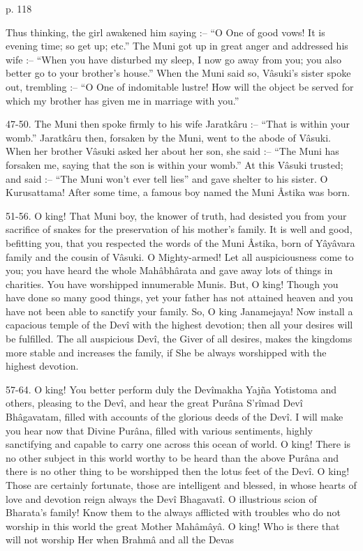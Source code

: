  

p. 118

 

Thus thinking, the girl awakened him saying :-- “O One of good vows! It is evening time; so get up; etc.” The Muni got up in great anger and addressed his wife :-- “When you have disturbed my sleep, I now go away from you; you also better go to your brother's house.” When the Muni said so, Vâsuki's sister spoke out, trembling :-- “O One of indomitable lustre! How will the object be served for which my brother has given me in marriage with you.”

 

47-50. The Muni then spoke firmly to his wife Jaratkâru :-- “That is within your womb.” Jaratkâru then, forsaken by the Muni, went to the abode of Vâsuki. When her brother Vâsuki asked her about her son, she said :-- “The Muni has forsaken me, saying that the son is within your womb.” At this Vâsuki trusted; and said :-- “The Muni won't ever tell lies” and gave shelter to his sister. O Kurusattama! After some time, a famous boy named the Muni Âstika was born.

 

51-56. O king! That Muni boy, the knower of truth, had desisted you from your sacrifice of snakes for the preservation of his mother's family. It is well and good, befitting you, that you respected the words of the Muni Âstika, born of Yâyâvara family and the cousin of Vâsuki. O Mighty-armed! Let all auspiciousness come to you; you have heard the whole Mahâbhârata and gave away lots of things in charities. You have worshipped innumerable Munis. But, O king! Though you have done so many good things, yet your father has not attained heaven and you have not been able to sanctify your family. So, O king Janamejaya! Now install a capacious temple of the Devî with the highest devotion; then all your desires will be fulfilled. The all auspicious Devî, the Giver of all desires, makes the kingdoms more stable and increases the family, if She be always worshipped with the highest devotion.

 

57-64. O king! You better perform duly the Devîmakha Yajña Yotistoma and others, pleasing to the Devî, and hear the great Purâna S’rîmad Devî Bhâgavatam, filled with accounts of the glorious deeds of the Devî. I will make you hear now that Divine Purâna, filled with various sentiments, highly sanctifying and capable to carry one across this ocean of world. O king! There is no other subject in this world worthy to be heard than the above Purâna and there is no other thing to be worshipped then the lotus feet of the Devî. O king! Those are certainly fortunate, those are intelligent and blessed, in whose hearts of love and devotion reign always the Devî Bhagavatî. O illustrious scion of Bharata's family! Know them to the always afflicted with troubles who do not worship in this world the great Mother Mahâmâyâ. O king! Who is there that will not worship Her when Brahmâ and all the Devas

